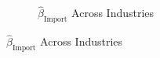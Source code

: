 \documentclass{article}
\begin{document}
\begin{figure}[ht!]
\begin{subfigure}[t]{0.32\textwidth}
        \caption{$\hat{\beta}_{\text{Import}}$ Across Industries}
    \end{subfigure}
\end{figure}

\end{document}
